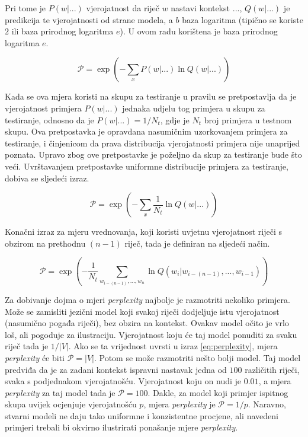\documentclass[times, utf8, diplomski, numeric]{fer}
\begin{document}
Pri tome je $P(w | ...)$ vjerojatnost da riječ $w$ nastavi kontekst $...$, $Q(w | ...)$  je predikcija te vjerojatnosti od strane modela, a $b$ baza logaritma (tipično se koriste $2$ ili baza prirodnog logaritma $e$). U ovom radu korištena je baza prirodnog logaritma $e$.

\[
\mathcal{P} = \exp\left(- \sum_x P(w | ...) \ln Q(w | ...) \right)
\]

Kada se ova mjera koristi na skupu za testiranje u pravilu se pretpostavlja da je vjerojatnost primjera $P(w | ...)$ jednaka udjelu tog primjera u skupu za testiranje, odnosno da je $P(w | ...) = 1 / N_t$, gdje je $N_t$ broj primjera u testnom skupu. Ova pretpostavka je opravdana nasumičnim uzorkovanjem primjera za testiranje, i činjenicom da prava distribucija vjerojatnosti primjera nije unaprijed poznata. Upravo zbog ove pretpostavke je poželjno da skup za testiranje bude što veći. Uvrštavanjem pretpostavke uniformne distribucije primjera za testiranje, dobiva se sljedeći izraz. 

\[
\mathcal{P} = \exp\left(- \sum_x \frac{1}{N_t} \ln Q(w | ...) \right)
\]

Konačni izraz za mjeru vrednovanja, koji koristi uvjetnu vjerojatnost riječi s obzirom na prethodnu $(n - 1)$ riječ, tada je definiran na sljedeći način.

\begin{equation}
\label{eq:perplexity}
\mathcal{P} = \exp\left(- \frac{1}{N_t} \sum_{w_{i - (n - 1)}, ..., w_n}  \ln Q(w_i | w_{i - (n - 1)}, ... , w_{i - 1}) \right)
\end{equation}

Za dobivanje dojma o mjeri \textit{perplexity} najbolje je razmotriti nekoliko primjera. Može se zamisliti jezični model koji svakoj riječi dodjeljuje istu vjerojatnost (nasumično pogađa riječi), bez obzira na kontekst. Ovakav model očito je vrlo loš, ali pogoduje za ilustraciju. Vjerojatnost koju će taj model ponuditi za svaku riječ tada je $1 / |V|$. Ako se ta vrijednost uvrsti u izraz \ref{eq:perplexity}, mjera \textit{perplexity} će biti $\mathcal{P} = |V|$. Potom se može razmotriti nešto bolji model. Taj model predviđa da je za zadani kontekst ispravni nastavak jedna od $100$ različitih riječi, svaka s podjednakom vjerojatnošću. Vjerojatnost koju on nudi je $0.01$, a mjera \textit{perplexity} za taj model tada je $\mathcal{P} = 100$. Dakle, za model koji primjer ispitnog skupa uvijek ocjenjuje vjerojatnošću $p$, mjera \textit{perplexity} je $\mathcal{P} = 1 / p$. Naravno, stvarni modeli ne daju tako uniformne i konzistentne procjene, ali navedeni primjeri trebali bi okvirno ilustrirati ponašanje mjere \textit{perplexity}.
\end{document}
